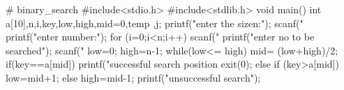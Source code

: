 # binary_search
#include<stdio.h>
#include<stdlib.h>
void main()
{
    int a[10],n,i,key,low,high,mid=0,temp ,j;
    printf("enter the sizen:\n");
    scanf("%
    printf("enter number:");
    for (i=0;i<n;i++)
    scanf("%
    printf("enter no to be searched");
    scanf("%
    low=0;
    high=n-1;
    while(low<= high)
    {
         mid= (low+high)/2;
        if(key==a[mid]){
            printf("successful search position %
            exit(0);
        }
        else if (key>a[mid])
            low=mid+1;
        else
            high=mid-1;
        }
printf("unsuccessful search");
}
